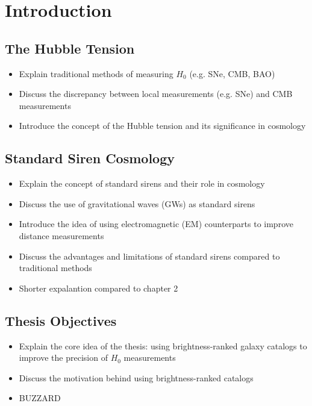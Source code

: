 \chapter{Introduction}
\label{chap:introdustion}

\section{The Hubble Tension}
\begin{itemize}
    \item Explain traditional methods of measuring $H_0$ (e.g. SNe, CMB, BAO)
    \item Discuss the discrepancy between local measurements (e.g. SNe) and CMB measurements
    \item Introduce the concept of the Hubble tension and its significance in cosmology
\end{itemize}

\section{Standard Siren Cosmology}
\begin{itemize}
    \item Explain the concept of standard sirens and their role in cosmology
    \item Discuss the use of gravitational waves (GWs) as standard sirens
    \item Introduce the idea of using electromagnetic (EM) counterparts to improve distance measurements
    \item Discuss the advantages and limitations of standard sirens compared to traditional methods
    \item Shorter expalantion compared to chapter 2
\end{itemize}

\section{Thesis Objectives}
\begin{itemize}
    \item Explain the core idea of the thesis: using brightness-ranked galaxy catalogs to improve the precision of $H_0$ measurements
    \item Discuss the motivation behind using brightness-ranked catalogs
    \item BUZZARD
\end{itemize}
